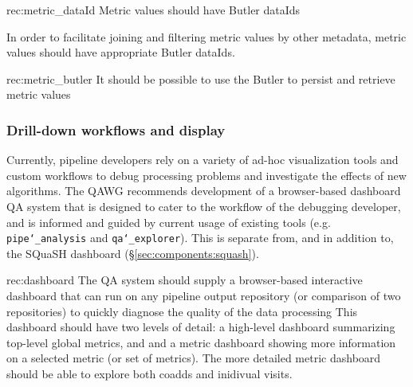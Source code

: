 \begin{recommendation}
    {rec:metric_dataId}
    {Metric values should have Butler dataIds}
\end{recommendation}

In order to facilitate joining and filtering metric values by other metadata, metric values should have appropriate Butler dataIds.

\begin{recommendation}
    {rec:metric_butler}
    {It should be possible to use the Butler to persist and retrieve metric values}
\end{recommendation}

\subsubsection{Drill-down workflows and display} \label{sec:metric_displays}

Currently, pipeline developers rely on a variety of ad-hoc visualization tools and custom workflows to debug processing problems and investigate the effects of new algorithms.
The QAWG recommends development of a browser-based dashboard QA system that is designed to cater to the workflow of the debugging developer, and is informed and guided by current usage of existing tools (e.g. \texttt{pipe\char`_analysis} and \texttt{qa\char`_explorer}).
This is separate from, and in addition to, the SQuaSH dashboard (\S \ref{sec:components:squash}).

\begin{recommendation}
    {rec:dashboard}
    {The QA system should supply a browser-based interactive dashboard that can run on any pipeline output repository (or comparison of two repositories) to quickly diagnose the quality of the data processing}
This dashboard should have two levels of detail: a high-level dashboard summarizing top-level global metrics, and and a metric dashboard showing more information on a selected metric (or set of metrics).  The more detailed metric dashboard should be able to explore both coadds and inidivual visits.
\end{recommendation}

